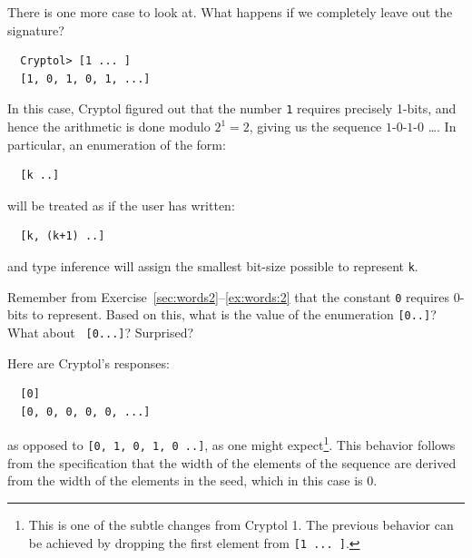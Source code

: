 There is one more case to look at. What happens if we completely leave
out the signature?
\begin{Verbatim}
  Cryptol> [1 ... ]
  [1, 0, 1, 0, 1, ...]
\end{Verbatim}
In this case, Cryptol figured out that the number {\tt 1} requires
precisely 1-bits, and hence the arithmetic is done modulo $2^1 = 2$,
giving us the sequence $1$-$0$-$1$-$0$ \ldots. In particular, an
enumeration of the form:
\begin{Verbatim}
  [k ..]
\end{Verbatim}
will be treated as if the user has written:
\begin{Verbatim}
  [k, (k+1) ..]
\end{Verbatim}
and type inference will assign the smallest bit-size possible to
represent {\tt k}.  

\begin{Exercise}\label{ex:arith:9}
  Remember from Exercise~\ref{sec:words2}--\ref{ex:words:2} that the
  constant {\tt 0} requires 0-bits to represent. Based on this, what
  is the value of the enumeration {\tt [0..]}? What about {\tt
    [0...]}? Surprised?
\end{Exercise}
\begin{Answer}
Here are Cryptol's responses:\indModular\indEnum\indInfSeq
\begin{Verbatim}
  [0]
  [0, 0, 0, 0, 0, ...]
\end{Verbatim}
as opposed to {\tt [0, 1, 0, 1, 0 ..]}, as one might
expect\footnote{This is one of the subtle changes from Cryptol 1. The
  previous behavior can be achieved by dropping the first element from
  {\tt [1 ... ]}.}.  This behavior follows from the specification that
the width of the elements of the sequence are derived from the width of
the elements in the seed, which in this case is 0.
\end{Answer}

